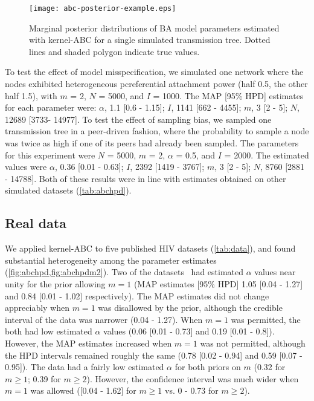 \documentclass[12pt]{article}\usepackage[]{graphicx}\usepackage[]{color}
\begin{document}
\begin{figure*}[ht]
    \centering
  \texttt{[image: abc-posterior-example.eps]}
  \vspace{6pt}
  \caption{
    Marginal posterior distributions of BA model parameters estimated
    with kernel-ABC for a single simulated transmission tree. Dotted
    lines and shaded polygon indicate true values.
  }
  \label{fig:abcex}
\end{figure*}



To test the effect of model misspecification, we simulated one network where
the nodes exhibited heterogeneous pcreferential attachment power (half 0.5, the
other half 1.5), with $m$ = 2, $N$ = 5000, and $I$ = 1000. The MAP [95\%
HPD] estimates for each parameter were: 
$\alpha$, 
  1.1 
  [0.6 -
   1.15];
$I$,
  1141 
  [662 -
   4455];
$m$,
  3 
  [2 -
   5];
$N$,
  12689 
  [3733-
   14977].
To test the effect of sampling bias, we sampled one transmission tree in a
peer-driven fashion, where the probability to sample a node was twice as high
if one of its peers had already been sampled. The parameters for this
experiment were $N$ = 5000, $m$ = 2, $\alpha$ = 0.5, and $I$ = 2000. The
estimated values were
$\alpha$, 
  0.36 
  [0.01 -
   0.63];
$I$,
  2392 
  [1419 -
   3767];
$m$,
  3 
  [2 -
   5];
$N$,
  8760 
  [2881 -
   14788].
Both of these results were in line with estimates obtained on other simulated
datasets (\cref{tab:abchpd}).

\subsection{Real data}



We applied kernel-ABC to five published HIV datasets (\cref{tab:data}),
and found substantial heterogeneity among the parameter estimates
(\cref{fig:abchpd,fig:abchpdm2}). Two of the
datasets~\autocite{niculescu2015recent, wang2015targeting} had estimated
$\alpha$ values near unity for the prior allowing $m = 1$ (MAP estimates
[95\% HPD] 
  1.05 
  [0.04 - 
   1.27]
and
  0.84 
  [0.01 -
   1.02] respectively).
The MAP estimates did not change appreciably when $m = 1$ was disallowed by the
prior, although the credible interval of the \textcite{niculescu2015recent}
data was narrower
  (0.04 - 
   1.27).
When $m = 1$ was permitted, the \textcite{li2015hiv, cuevas2009hiv} both had
low estimated $\alpha$ values
  (0.06 
  [0.01 - 
  0.73]
and
  0.19 
  [0.01 -
   0.8]). 
However, the MAP estimates increased when $m = 1$ was not permitted, although
the HPD intervals remained roughly the same
  (0.78 
  [0.02 - 
  0.94]
and
  0.59 
  [0.07 -
   0.95]).
The \textcite{novitsky2014impact} data had a fairly low estimated $\alpha$
for both priors on $m$
  (0.32 for $m \geq 1$;
   0.39 for $m \geq 2$).
However, the confidence interval was much wider when $m = 1$ was allowed
  ([0.04 -
    1.62] for $m \geq 1$ vs.
    0 -
    0.73 for $m \geq 2$).
\end{document}

